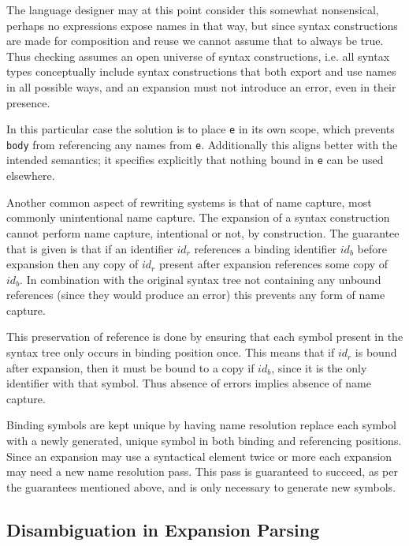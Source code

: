 \documentclass{kththesis}
\begin{document}
The language designer may at this point consider this somewhat nonsensical, perhaps no expressions expose names in that way, but since syntax constructions are made for composition and reuse we cannot assume that to always be true. Thus checking assumes an open universe of syntax constructions, i.e. all syntax types conceptually include syntax constructions that both export and use names in all possible ways, and an expansion must not introduce an error, even in their presence.

In this particular case the solution is to place \texttt{e} in its own scope, which prevents \texttt{body} from referencing any names from \texttt{e}. Additionally this aligns better with the intended semantics; it specifies explicitly that nothing bound in \texttt{e} can be used elsewhere.

Another common aspect of rewriting systems is that of name capture, most commonly unintentional name capture. The expansion of a syntax construction cannot perform name capture, intentional or not, by construction. The guarantee that is given is that if an identifier $id_r$ references a binding identifier $id_b$ before expansion then any copy of $id_r$ present after expansion references some copy of $id_b$. In combination with the original syntax tree not containing any unbound references (since they would produce an error) this prevents any form of name capture.

This preservation of reference is done by ensuring that each symbol present in the syntax tree only occurs in binding position once. This means that if $id_r$ is bound after expansion, then it must be bound to a copy if $id_b$, since it is the only identifier with that symbol. Thus absence of errors implies absence of name capture.

Binding symbols are kept unique by having name resolution replace each symbol with a newly generated, unique symbol in both binding and referencing positions. Since an expansion may use a syntactical element twice or more each expansion may need a new name resolution pass. This pass is guaranteed to succeed, as per the guarantees mentioned above, and is only necessary to generate new symbols.


\subsection{Disambiguation in Expansion Parsing} \label{sec:disambiguation-implementation}
\end{document}
